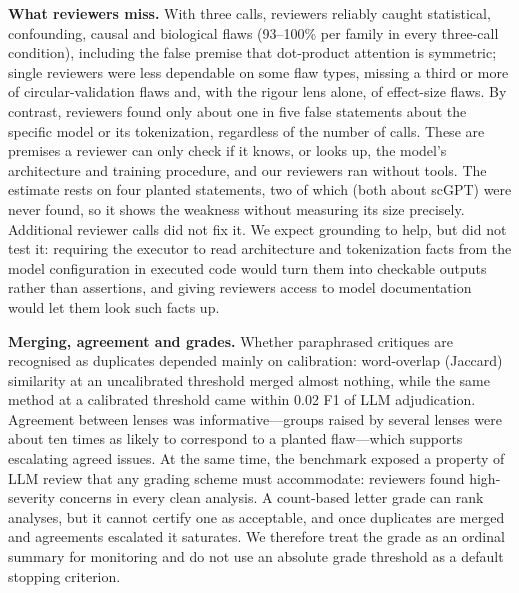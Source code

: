 \textbf{What reviewers miss.} With three calls, reviewers reliably caught statistical, confounding, causal and biological flaws (93--100\% per family in every three-call condition), including the false premise that dot-product attention is symmetric; single reviewers were less dependable on some flaw types, missing a third or more of circular-validation flaws and, with the rigour lens alone, of effect-size flaws. By contrast, reviewers found only about one in five false statements about the specific model or its tokenization, regardless of the number of calls. These are premises a reviewer can only check if it knows, or looks up, the model's architecture and training procedure, and our reviewers ran without tools. The estimate rests on four planted statements, two of which (both about scGPT) were never found, so it shows the weakness without measuring its size precisely. Additional reviewer calls did not fix it. We expect grounding to help, but did not test it: requiring the executor to read architecture and tokenization facts from the model configuration in executed code would turn them into checkable outputs rather than assertions, and giving reviewers access to model documentation would let them look such facts up.

\textbf{Merging, agreement and grades.} Whether paraphrased critiques are recognised as duplicates depended mainly on calibration: word-overlap (Jaccard) similarity at an uncalibrated threshold merged almost nothing, while the same method at a calibrated threshold came within 0.02 F1 of LLM adjudication. Agreement between lenses was informative---groups raised by several lenses were about ten times as likely to correspond to a planted flaw---which supports escalating agreed issues. At the same time, the benchmark exposed a property of LLM review that any grading scheme must accommodate: reviewers found high-severity concerns in every clean analysis. A count-based letter grade can rank analyses, but it cannot certify one as acceptable, and once duplicates are merged and agreements escalated it saturates. We therefore treat the grade as an ordinal summary for monitoring and do not use an absolute grade threshold as a default stopping criterion.

